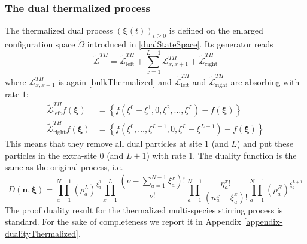 \documentclass[10pt]{article}
\numberwithin{equation}{section}
\numberwithin{equation}{subsection}
\begin{document}
\subsubsection{The dual thermalized process}
The thermalized dual process $(\bm{\xi}(t))_{t\geq 0}$ is defined on the enlarged configuration space $\widetilde{\Omega}$ introduced in \eqref{dualStateSpace}. Its generator reads
\begin{equation}
	\widetilde{\mathcal{L}}^{TH}=\widetilde{\mathcal{L}}_{\text{left}}^{TH}+\sum_{x=1}^{L-1}\mathcal{L}_{x,x+1}^{TH}+\widetilde{\mathcal{L}}_{\text{right}}^{TH}
\end{equation}
where $\mathcal{L}^{TH}_{x,x+1}$ is again \eqref{bulkThermalized} and $\widetilde{\mathcal{L}}_{\text{left}}^{TH}$ and $\widetilde{\mathcal{L}}_{\text{right}}^{TH}$ are absorbing with rate $1$:
\begin{align}
	\widetilde{\mathcal{L}}_{\text{left}}^{TH}f(\bm{\xi})&=\left\{f(\xi^{0}+\xi^{1},0,\xi^{2},\ldots,\xi^{L})-f(\bm{\xi})\right\}\nonumber\\ \widetilde{\mathcal{L}}_{\text{right}}^{TH}f(\bm{\xi})&=\left\{f(\xi^{0},\ldots,\xi^{L-1},0,\xi^{L}+\xi^{L+1})-f(\bm{\xi})\right\}
\end{align}
This means that they remove all dual particles at site $1$ (and $L$) and put these particles in the extra-site $0$ (and $L+1$) with rate 1. The duality function is the same as the original process, i.e.
\begin{equation}
	D(\bm{n},\bm{\xi})=\prod_{a=1}^{N-1}\left(\rho_{a}^{L}\right)^{\xi_{a}^{0}}\prod_{x=1}^{L}\frac{(\nu-\sum_{a=1}^{N-1}\xi_{a}^{x})!}{\nu!}\prod_{a=1}^{N-1}\frac{\eta_{a}^{x}!}{(n_{a}^{x}-\xi_{a}^{x})!}\prod_{a=1}^{N-1}\left(\rho_{a}^{R}\right)^{\xi_{a}^{L+1}}
\end{equation}
The proof duality result for the thermalized multi-species stirring process is standard. For the sake of completeness we report it in Appendix \ref{appendix-dualityThermalized}.
\end{document}
